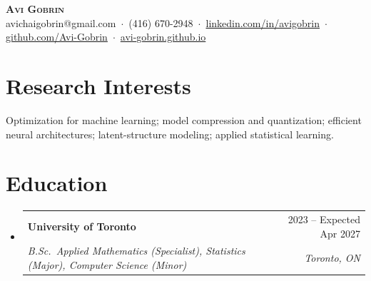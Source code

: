 \documentclass[letterpaper,11pt]{article}
\makeatletter
\newcommand{\cvSubheading}[4]{
  \vspace{-2pt}\item
    \begin{tabular*}{0.97\textwidth}[t]{l@{\extracolsep{\fill}}r}
      \textbf{#1} & #2 \\
      \textit{\small#3} & \textit{\small #4} \\
    \end{tabular*}\vspace{-5pt}
}
\newcommand{\cvSubHeadingListStart}{\begin{itemize}[leftmargin=0.15in, label={}]}
\newcommand{\cvSubHeadingListEnd}{\end{itemize}}
\makeatother
\begin{document}
\begin{center}
  \textbf{\Huge \scshape Avi Gobrin} \\ \vspace{4pt}
  \small avichaigobrin@gmail.com \,$\cdot$\,
  (416) 670-2948 \,$\cdot$\,
  \href{https://www.linkedin.com/in/avigobrin/}{\color{blue}linkedin.com/in/avigobrin} \,$\cdot$\,
  \href{https://github.com/Avi-Gobrin}{\color{blue}github.com/Avi-Gobrin} \,$\cdot$\,
  \href{https://avi-gobrin.github.io/personal-site/}{\color{blue}avi-gobrin.github.io}
\end{center}

\vspace{-4pt}

\section{Research Interests}
\begin{itemize}[leftmargin=0.15in, label={}]
  \small{\item{
    Optimization for machine learning; model compression and quantization; efficient neural architectures; latent-structure modeling; applied statistical learning.
  }}
\end{itemize}

\vspace{-8pt}

\section{Education}
\cvSubHeadingListStart
  \cvSubheading
    {University of Toronto}{2023 -- Expected Apr 2027}
    {B.Sc.\ Applied Mathematics (Specialist), Statistics (Major), Computer Science (Minor)}{Toronto, ON}
\cvSubHeadingListEnd
\end{document}
